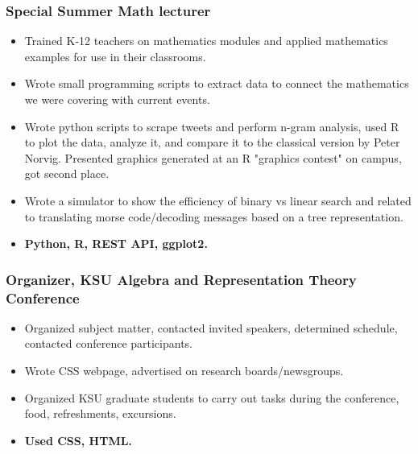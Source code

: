 \documentclass[a4paper,10pt,notitlepage]{article}
\begin{document}
\subsubsection*{Special Summer Math lecturer}
	\begin{itemize}
	\vspace{-5pt}\item 	Trained K-12 teachers on mathematics modules and applied mathematics examples for use in their classrooms.
	\vspace{-5pt}\item 	Wrote small programming scripts to extract data to connect the mathematics we were covering with current events. 
	\vspace{-5pt}\item 	Wrote python scripts to scrape tweets and perform n-gram analysis, used R to plot the data, analyze it, and compare it to the classical version by Peter Norvig. Presented graphics generated at an R "graphics contest" on campus, got second place.
	\vspace{-5pt}\item 	Wrote a simulator to show the efficiency of binary vs linear search and related to translating morse code/decoding messages based on a tree representation.
	 \vspace{-5pt}\item 	\textbf{Python, R, REST API, ggplot2.}
	\end{itemize}

\subsubsection*{Organizer, KSU Algebra and Representation Theory Conference}
	\begin{itemize}
	\vspace{-5pt}\item 	Organized subject matter, contacted invited speakers, determined schedule, contacted conference participants.
	\vspace{-5pt}\item 	Wrote CSS webpage, advertised on research boards/newsgroups.
	\vspace{-5pt}\item 	Organized KSU graduate students to carry out tasks during the conference, food, refreshments, excursions.
	 \vspace{-5pt}\item 	\textbf{Used CSS, HTML.}
	\end{itemize}
\end{document}

